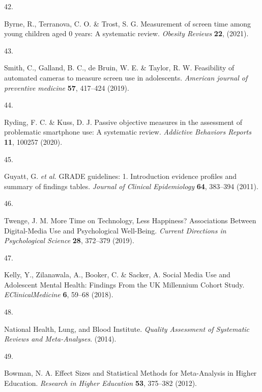\documentclass[
  english,
  man]{apa6}
\newlength{\cslhangindent}
\newlength{\csllabelwidth}
\newenvironment{CSLReferences}[2] %
 {%
  \setlength{\parindent}{0pt}
  \ifodd #1 \everypar{\setlength{\hangindent}{\cslhangindent}}\ignorespaces\fi
  \ifnum #2 > 0
  \setlength{\parskip}{#2\baselineskip}
  \fi
 }%
 {}
\newcommand{\CSLLeftMargin}[1]{\parbox[t]{\csllabelwidth}{#1}}
\newcommand{\CSLRightInline}[1]{\parbox[t]{\linewidth - \csllabelwidth}{#1}\break}
\begin{document}
\begin{CSLReferences}{0}{0}
\leavevmode{}%
\CSLLeftMargin{42. }
\CSLRightInline{Byrne, R., Terranova, C. O. \& Trost, S. G. Measurement of screen time among young children aged 0\textendash 6 years: {A} systematic review. \emph{Obesity Reviews} \textbf{22}, (2021).}

\leavevmode{}%
\CSLLeftMargin{43. }
\CSLRightInline{Smith, C., Galland, B. C., de Bruin, W. E. \& Taylor, R. W. Feasibility of automated cameras to measure screen use in adolescents. \emph{American journal of preventive medicine} \textbf{57}, 417--424 (2019).}

\leavevmode{}%
\CSLLeftMargin{44. }
\CSLRightInline{Ryding, F. C. \& Kuss, D. J. Passive objective measures in the assessment of problematic smartphone use: {A} systematic review. \emph{Addictive Behaviors Reports} \textbf{11}, 100257 (2020).}

\leavevmode{}%
\CSLLeftMargin{45. }
\CSLRightInline{Guyatt, G. \emph{et al.} {GRADE} guidelines: 1. {Introduction}\textemdash{{GRADE}} evidence profiles and summary of findings tables. \emph{Journal of Clinical Epidemiology} \textbf{64}, 383--394 (2011).}

\leavevmode{}%
\CSLLeftMargin{46. }
\CSLRightInline{Twenge, J. M. More {Time} on {Technology}, {Less Happiness}? {Associations Between Digital-Media Use} and {Psychological Well-Being}. \emph{Current Directions in Psychological Science} \textbf{28}, 372--379 (2019).}

\leavevmode{}%
\CSLLeftMargin{47. }
\CSLRightInline{Kelly, Y., Zilanawala, A., Booker, C. \& Sacker, A. Social {Media Use} and {Adolescent Mental Health}: {Findings From} the {UK Millennium Cohort Study}. \emph{EClinicalMedicine} \textbf{6}, 59--68 (2018).}

\leavevmode{}%
\CSLLeftMargin{48. }
\CSLRightInline{National Health, Lung, and Blood Institute. \emph{Quality {Assessment} of {Systematic Reviews} and {Meta-Analyses}}. (2014).}

\leavevmode{}%
\CSLLeftMargin{49. }
\CSLRightInline{Bowman, N. A. Effect {Sizes} and {Statistical Methods} for {Meta-Analysis} in {Higher Education}. \emph{Research in Higher Education} \textbf{53}, 375--382 (2012).}


\end{CSLReferences}
\end{document}
